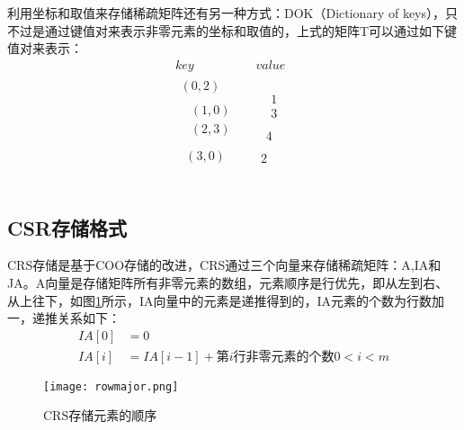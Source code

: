 利用坐标和取值来存储稀疏矩阵还有另一种方式：DOK（Dictionary of keys），只不过是通过键值对来表示非零元素的坐标和取值的，上式的矩阵T可以通过如下键值对来表示：
\[\begin{matrix}
	key&		value\\
	\begin{array}{c}
	\left( 0,2 \right)\\
	\begin{array}{c}
	\begin{array}{c}
	\left( 1,0 \right)\\
	\left( 2,3 \right)\\
\end{array}\\
	\left( 3,0 \right)\\
\end{array}\\
\end{array}&		\begin{array}{c}
	\begin{array}{c}
	\begin{array}{c}
	1\\
	3\\
\end{array}\\
	4\\
\end{array}\\
	2\\
\end{array}\\
\end{matrix}\]

\subsection{CSR存储格式}

CRS存储是基于COO存储的改进，CRS通过三个向量来存储稀疏矩阵：A,IA和JA。A向量是存储矩阵所有非零元素的数组，元素顺序是行优先，即从左到右、从上往下，如图\ref{rowmajor}所示，IA向量中的元素是递推得到的，IA元素的个数为行数加一，递推关系如下：
\[
\begin{aligned}
IA\left[ 0 \right] &=0
\\
IA\left[ i \right] &=IA\left[ i-1 \right] +第i\text{行非零元素的个数} 0<i<m
\end{aligned}
\]
\begin{figure}[h]
	\texttt{[image: rowmajor.png]}
	\caption{CRS存储元素的顺序}
	\label{rowmajor}
\end{figure}


